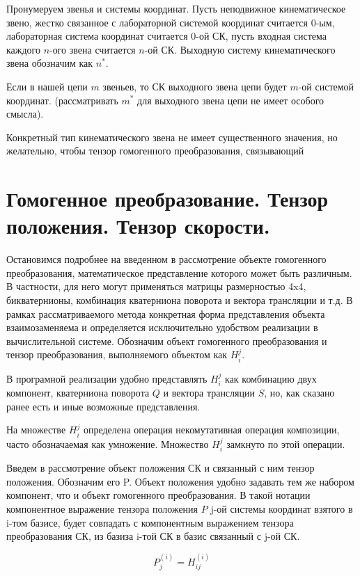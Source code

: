 \documentclass[12pt,a4paper,titlepage]{article}
\begin{document}
Пронумеруем звенья и системы координат. Пусть неподвижное кинематическое звено, жестко связанное с лабораторной системой координат считается 0-ым, лабораторная система координат считается 0-ой СК, пусть входная система каждого $n$-ого звена считается $n$-ой СК. Выходную систему кинематического звена обозначим как $n^*$. 

Если в нашей цепи $m$ звеньев, то СК выходного звена цепи будет $m$-ой системой координат. (рассматривать $m^*$ для выходного звена цепи не имеет особого смысла).

Конкретный тип кинематического звена не имеет существенного значения, но желательно, чтобы тензор гомогенного преобразования, связывающий

\newpage
\section{Гомогенное преобразование. Тензор положения. Тензор скорости.}\label{geom}

Остановимся подробнее на введенном в рассмотрение объекте гомогенного преобразования, математическое представление которого может быть различным. В частности, для него могут применяться матрицы размерностью 4x4, бикватернионы, комбинация кватерниона поворота и вектора трансляции и т.д. В рамках рассматриваемого метода конкретная форма представления объекта взаимозаменяема и определяется исключительно удобством реализации в вычислительной системе. Обозначим объект гомогенного преобразования и тензор преобразования, выполняемого объектом как $H^j_i$. 

В програмной реализации удобно представлять $H^j_i$ как комбинацию двух компонент, кватерниона поворота $Q$ и вектора трансляции $S$, но, как сказано ранее есть и иные возможные представления. 

На множестве $H^j_i$ определена операция некомутативная операция композиции, часто обозначаемая как умножение. Множество $H^j_i$ замкнуто по этой операции.

Введем в рассмотрение объект положения СК и связанный с ним тензор положения. Обозначим его P. Объект положения удобно задавать тем же набором компонент, что и объект гомогенного преобразования. В такой нотации компонентное выражение тензора положения $P$ j-ой системы координат взятого в i-том базисе, будет совпадать с компонентным выражением тензора преобразования СК, из базиза i-той СК в базис связанный с j-ой СК. 

\begin{equation}
P_j^{(i)} = H_{ij}^{(i)}
\end{equation}
\end{document}
